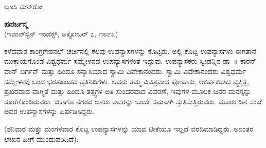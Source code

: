 \begin{flushright}
ಲೂಸಿ ಮನ್‍ರೋ
\end{flushright}

\begin{center}
\textbf{ಪುನರ್ಜನ್ಮ}\\ (ಇವಾನ್​ಸ್ಟನ್​ ಇಂಡೆಕ್ಸ್​, ಅಕ್ಟೋಬರ್​ ೭, ೧೮೯೩)
\end{center}

ಕಳೆದವಾರ ಕಾಂಗ್ರಗೇಶನಲ್​ ಚರ್ಚಿನಲ್ಲಿ ಕೆಲವು ಉಪನ್ಯಾಸಗಳನ್ನು ಕೊಟ್ಟರು. ಅಲ್ಲಿ ಕೊಟ್ಟ ಉಪನ್ಯಾಸಗಳು ಈಗತಾನೆ ಮುಕ್ತಾಯಗೊಂಡ ವಿಶ್ವಧರ್ಮ ಸಮ್ಮೇಳನದ ಉಪನ್ಯಾಸಗಳಂತೆ ಇದ್ದುವು. ಉಪನ್ಯಾಸಕರು ಸ್ವೀಡನ್ನಿನ ಡಾ~॥ ಕಾರನ್​ ವಾನ್​ ಬರ್ಗನ್​ ಮತ್ತು ಹಿಂದೂ ಸನ್ಯಾಸಿಯಾದ ಸ್ವಾಮಿ ವಿವೇಕಾನಂದರು. ಸ್ವಾಮಿ ವಿವೇಕಾನಂದರು ವಿಶ್ವಧರ್ಮ ಸಮ್ಮೇಳನಕ್ಕೆ ಬಂದ ಭರತಖಂಡದ ಪ್ರತಿನಿಧಿಗಳು. ಅವರು ತಮ್ಮ ವಿಚಿತ್ರವಾದ ಪೋಷಾಕು, ಆಕರ್ಷಕವಾದ ವ್ಯಕ್ತಿತ್ವ, ಪ್ರಖರವಾದ ವಾಗ್ಮಿತೆ ಮತ್ತು ಹಿಂದೂ ತತ್ತ್ವಗಳ ಅತಿ ಸುಂದರವಾದ ವಿವರಣೆ, ಇವುಗಳ ಮೂಲಕ ಜನರ ಮನಸ್ಸನ್ನು ಸೂರೆಗೊಂಡಿರುವರು. ಚಿಕಾಗೊ ನಗರದ ಜನರು ಅವರನ್ನು ಒಂದೇ ಸಮನಾಗಿ ಸ್ತುತಿಸುತ್ತಿರುವರು. ಮೂರು ದಿನ ಸಂಜೆ ಅವರ ಉಪನ್ಯಾಸಗಳನ್ನು ಏರ್ಪಡಿಸಿದ್ದರು.

(ಶನಿವಾರ ಮತ್ತು ಮಂಗಳವಾರ ಕೊಟ್ಟ ಉಪನ್ಯಾಸಗಳನ್ನು ಯಾವ ಟೀಕೆಯೂ ಇಲ್ಲದೆ ವರದಿಮಾಡಿದ್ದರು. ಅನಂತರ ಲೇಖನ ಹೀಗೆ ಮುಂದುವರಿದಿದೆ):

